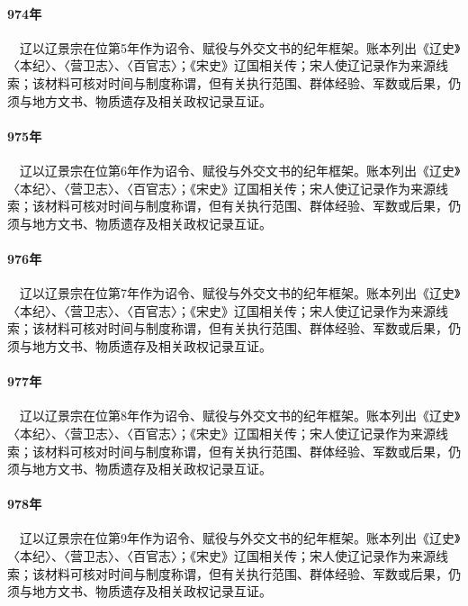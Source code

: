 \paragraph{974年}　辽以辽景宗在位第5年作为诏令、赋役与外交文书的纪年框架。账本列出《辽史》〈本纪〉、〈营卫志〉、〈百官志〉；《宋史》辽国相关传；宋人使辽记录作为来源线索；该材料可核对时间与制度称谓，但有关执行范围、群体经验、军数或后果，仍须与地方文书、物质遗存及相关政权记录互证。

\paragraph{975年}　辽以辽景宗在位第6年作为诏令、赋役与外交文书的纪年框架。账本列出《辽史》〈本纪〉、〈营卫志〉、〈百官志〉；《宋史》辽国相关传；宋人使辽记录作为来源线索；该材料可核对时间与制度称谓，但有关执行范围、群体经验、军数或后果，仍须与地方文书、物质遗存及相关政权记录互证。

\paragraph{976年}　辽以辽景宗在位第7年作为诏令、赋役与外交文书的纪年框架。账本列出《辽史》〈本纪〉、〈营卫志〉、〈百官志〉；《宋史》辽国相关传；宋人使辽记录作为来源线索；该材料可核对时间与制度称谓，但有关执行范围、群体经验、军数或后果，仍须与地方文书、物质遗存及相关政权记录互证。

\paragraph{977年}　辽以辽景宗在位第8年作为诏令、赋役与外交文书的纪年框架。账本列出《辽史》〈本纪〉、〈营卫志〉、〈百官志〉；《宋史》辽国相关传；宋人使辽记录作为来源线索；该材料可核对时间与制度称谓，但有关执行范围、群体经验、军数或后果，仍须与地方文书、物质遗存及相关政权记录互证。

\paragraph{978年}　辽以辽景宗在位第9年作为诏令、赋役与外交文书的纪年框架。账本列出《辽史》〈本纪〉、〈营卫志〉、〈百官志〉；《宋史》辽国相关传；宋人使辽记录作为来源线索；该材料可核对时间与制度称谓，但有关执行范围、群体经验、军数或后果，仍须与地方文书、物质遗存及相关政权记录互证。

